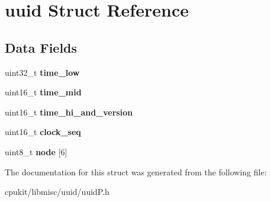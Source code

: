 \hypertarget{structuuid}{}\section{uuid Struct Reference}
\label{structuuid}
\subsection*{Data Fields}
\begin{DoxyCompactItemize}
\item 
\mbox{\label{structuuid_aeabb39e916355b8a0cdd8912e8c27317}} 
uint32\+\_\+t {\bfseries time\+\_\+low}
\item 
\mbox{\label{structuuid_a0b92f5d247288e1db17317232ae29694}} 
uint16\+\_\+t {\bfseries time\+\_\+mid}
\item 
\mbox{\label{structuuid_ac89486073118cbca117c9204aeecb9d4}} 
uint16\+\_\+t {\bfseries time\+\_\+hi\+\_\+and\+\_\+version}
\item 
\mbox{\label{structuuid_a32dab4fbd7eae652430523ef77d477ff}} 
uint16\+\_\+t {\bfseries clock\+\_\+seq}
\item 
\mbox{\label{structuuid_a2d6a632649ae128bc68dc0a7c154b3ba}} 
uint8\+\_\+t {\bfseries node} \mbox{[}6\mbox{]}
\end{DoxyCompactItemize}


The documentation for this struct was generated from the following file\+:\begin{DoxyCompactItemize}
\item 
cpukit/libmisc/uuid/uuid\+P.\+h\end{DoxyCompactItemize}
